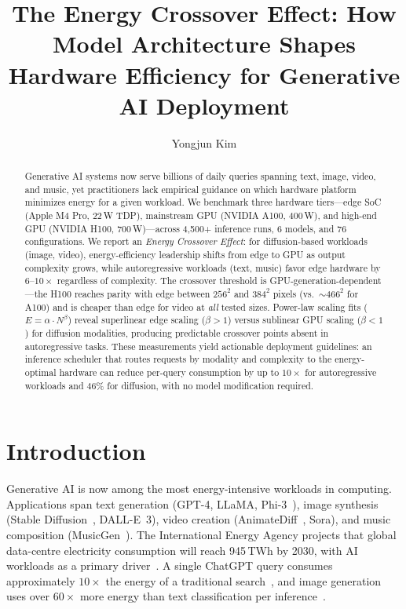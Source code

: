 \documentclass[acmlarge,manuscript,screen,review]{acmart}
\title{The Energy Crossover Effect: How Model Architecture Shapes Hardware Efficiency for Generative AI Deployment}
\author{Yongjun Kim}
\affiliation{%
  \institution{Department of Software, Ajou University}
  \city{Suwon}
  \country{South Korea}
}
\begin{document}
\begin{abstract}
Generative AI systems now serve billions of daily queries spanning text, image, video, and music, yet practitioners lack empirical guidance on which hardware platform minimizes energy for a given workload.
We benchmark three hardware tiers---edge SoC (Apple M4 Pro, 22\,W TDP), mainstream GPU (NVIDIA A100, 400\,W), and high-end GPU (NVIDIA H100, 700\,W)---across 4,500+ inference runs, 6 models, and 76 configurations.
We report an \emph{Energy Crossover Effect}: for diffusion-based workloads (image, video), energy-efficiency leadership shifts from edge to GPU as output complexity grows, while autoregressive workloads (text, music) favor edge hardware by $6$--$10\times$ regardless of complexity.
The crossover threshold is GPU-generation-dependent---the H100 reaches parity with edge between $256^2$ and $384^2$ pixels (vs.\ ${\sim}466^2$ for A100) and is cheaper than edge for video at \emph{all} tested sizes.
Power-law scaling fits ($E = \alpha \cdot N^\beta$) reveal superlinear edge scaling ($\beta > 1$) versus sublinear GPU scaling ($\beta < 1$) for diffusion modalities, producing predictable crossover points absent in autoregressive tasks.
These measurements yield actionable deployment guidelines: an inference scheduler that routes requests by modality and complexity to the energy-optimal hardware can reduce per-query consumption by up to $10\times$ for autoregressive workloads and $46\%$ for diffusion, with no model modification required.
\end{abstract}

\maketitle

\section{Introduction}
\label{sec:intro}

Generative AI is now among the most energy-intensive workloads in computing.
Applications span text generation (GPT-4, LLaMA, Phi-3~\cite{abdin2024phi3}), image synthesis (Stable Diffusion~\cite{rombach2022high}, DALL-E~3), video creation (AnimateDiff~\cite{guo2024animatediff}, Sora), and music composition (MusicGen~\cite{copet2024musicgen}).
The International Energy Agency projects that global data-centre electricity consumption will reach 945\,TWh by 2030, with AI workloads as a primary driver~\cite{iea2024}.
A single ChatGPT query consumes approximately $10\times$ the energy of a traditional search~\cite{devries2023growing}, and image generation uses over $60\times$ more energy than text classification per inference~\cite{luccioni2024power}.
\end{document}

